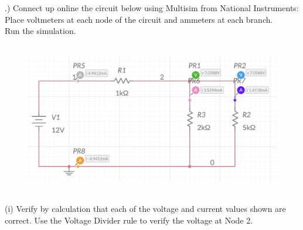 \documentclass[12pt]{article}
\begin{document}
.) Connect up online the circuit below using Multisim from National Instruments:\\
Place voltmeters at each node of the circuit and ammeters at each branch.\\ Run the simulation.\\
\\
\begin{figure}[!h] 
	\begin{centering}
		\includegraphics[keepaspectratio = true, width = 5in]{Q1(i).png}
	\end{centering}
\end{figure}\\
\noindent (i) Verify by calculation that each of the voltage and current values shown are correct. Use the Voltage Divider rule to verify the voltage at Node 2.\\
\end{document}

